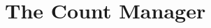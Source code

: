 \documentclass{IEEEtran}
\newcommand{\ct}{\mathit{ct}}
\begin{document}

\section{The Count Manager} 



\end{document}
